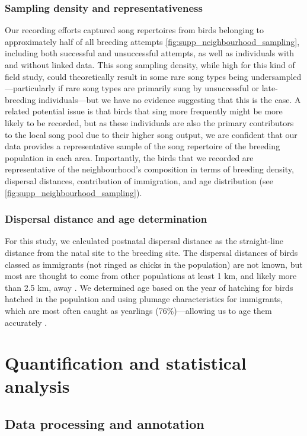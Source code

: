 \documentclass[9pt, onecolumn, twoside, lineno]{gsajnl}
\begin{document}
\subsubsection{Sampling density and representativeness}
Our recording efforts captured song repertoires from birds belonging to approximately half of all breeding attempts \autoref{fig:supp_neighbourhood_sampling}, including both successful and unsuccessful attempts, as well as individuals with and without linked data. This song sampling density, while high for this kind of field study, could theoretically result in some rare song types being undersampled---particularly if rare song types are primarily sung by unsuccessful or late-breeding individuals---but we have no evidence suggesting that this is the case. A related potential issue is that birds that sing more frequently might be more likely to be recorded, but as these individuals are also the primary contributors to the local song pool due to their higher song output, we are confident that our data provides a representative sample of the song repertoire of the breeding population in each area. Importantly, the birds that we recorded are representative of the neighbourhood's composition in terms of breeding density, dispersal distances, contribution of immigration, and age distribution (see \autoref{fig:supp_neighbourhood_sampling}).

\subsubsection{Dispersal distance and age determination}
For this study, we calculated postnatal dispersal distance as the straight-line distance from the natal site to the breeding site. The dispersal distances of birds classed as immigrants (not ringed as chicks in the population) are not known, but most are thought to come from other populations at least 1 km, and likely more than 2.5 km, away \autocite{verhulst1997, quinn2011}. We determined age based on the year of hatching for birds hatched in the population and using plumage characteristics for immigrants, which are most often caught as yearlings (76\%)---allowing us to age them accurately \autocite{woodman2023}.

\section{Quantification and statistical analysis}

\subsection{Data processing and annotation}
\end{document}
